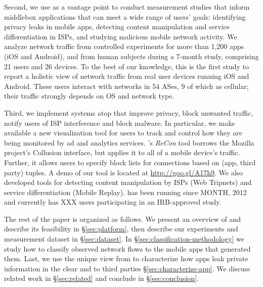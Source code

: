 Second, we use \meddle as a vantage point to conduct measurement studies that inform 
middlebox applications that can meet a wide range of users' goals: identifying privacy leaks in mobile apps, detecting content 
manipulation and service differentiation in ISPs, and studying malicious mobile network activity. We analyze network traffic from controlled experiments for more than 1,200 apps (iOS and Android), 
and from human subjects during a 7-month study, comprising 21 users and 26 devices. To the best of our knowledge, this is the first study to report a holistic 
view of network traffic from real user devices running iOS and Android. These users interact with networks in 54 ASes, 9 of which as cellular; their traffic 
strongly depends on OS and network type.


Third, we implement systems atop \meddle that improve 
privacy, block unwanted traffic, notify users of ISP interference and block malware. 
In particular, we make available a new visualization tool for users to track and control how 
they are being monitored by ad and analytics services. \platname{}'s \emph{ReCon} tool borrows the Mozilla project's Collusion 
interface, but applies it to all of a mobile device's traffic. Further, it allows users to specify block lists for connections
 based on (app, third party) tuples. A demo of our tool is located at \url{http://goo.gl/A17h9}. 
 We also developed tools for detecting content manipulation by ISPs (Web Tripnets) and 
 service differentiation (Mobile Replay). 
\meddle has been running since 
MONTH, 2012 and currently has XXX users participating in an IRB-approved study. 






The rest of the paper is organized as follows. 
We present an overview of \platname and describe its feasibility in \S\ref{sec:platform}, then describe our experiments and measurement dataset in \S\ref{sec:dataset}.
In  \S\ref{sec:classification-methodology} we study how to classify observed network flows to the mobile apps that generated them. Last, we use the 
unique view from \platname to characterize how apps leak private information in the clear and to third parties \S\ref{sec:characterize-app}. 
We discuss related work in \S\ref{sec:related} and conclude in \S\ref{sec:conclusion}.

